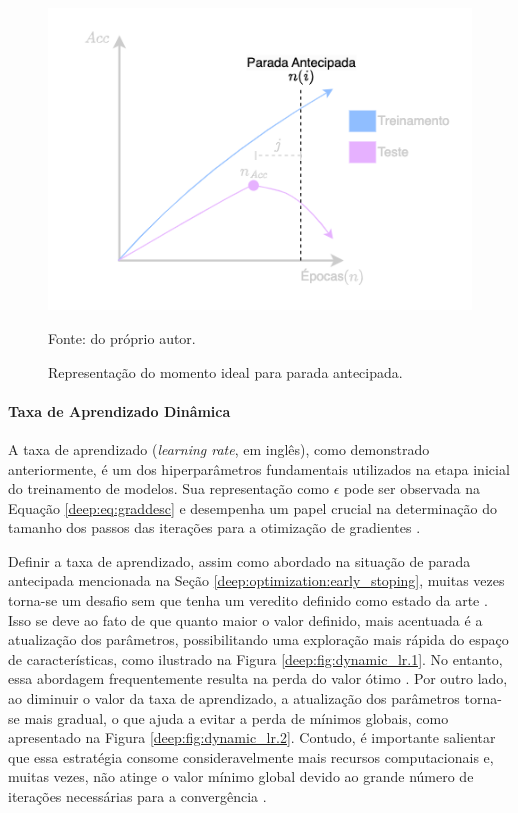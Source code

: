 \begin{figure}[H]
    \centering
    \caption[Parada antecipada.]{Representação do momento ideal para parada antecipada.}
    \includegraphics[width=0.6\linewidth]{recursos/imagens/deep/early_stopping.png}
    \label{deep:fig:earlystopping}

    Fonte: do próprio autor.
\end{figure}


\paragraph{Taxa de Aprendizado Dinâmica}
\label{deep:optimization:dynamic_lr}

A taxa de aprendizado (\textit{learning rate}, em inglês), como demonstrado anteriormente, é um dos hiperparâmetros fundamentais utilizados na etapa inicial do treinamento de modelos. Sua representação como $\epsilon$ pode ser observada na Equação \ref{deep:eq:graddesc} e desempenha um papel crucial na determinação do tamanho dos passos das iterações para a otimização de gradientes \citep{Smith2017CyclicalNetworks}.

Definir a taxa de aprendizado, assim como abordado na situação de parada antecipada mencionada na Seção \ref{deep:optimization:early_stoping}, muitas vezes torna-se um desafio sem que tenha um veredito definido como estado da arte \citep{Goodfellow2016}. Isso se deve ao fato de que quanto maior o valor definido, mais acentuada é a atualização dos parâmetros, possibilitando uma exploração mais rápida do espaço de características, como ilustrado na Figura \ref{deep:fig:dynamic_lr.1}. No entanto, essa abordagem frequentemente resulta na perda do valor ótimo \citep{Tang2021AnPump}. Por outro lado, ao diminuir o valor da taxa de aprendizado, a atualização dos parâmetros torna-se mais gradual, o que ajuda a evitar a perda de mínimos globais, como apresentado na Figura \ref{deep:fig:dynamic_lr.2}. Contudo, é importante salientar que essa estratégia consome consideravelmente mais recursos computacionais e, muitas vezes, não atinge o valor mínimo global devido ao grande número de iterações necessárias para a convergência \citep{Tang2021AnPump}.

